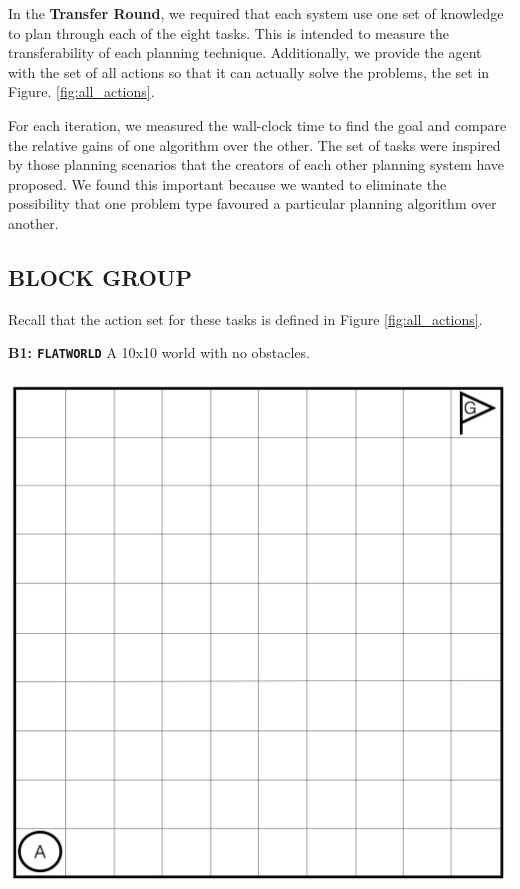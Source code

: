 \documentclass[]{article}
\begin{document}
In the {\bf Transfer Round}, we required that each system use one set of knowledge to plan through each of the eight tasks. This is intended to measure the transferability of each planning technique. Additionally, we provide the agent with the set of all actions so that it can actually solve the problems, the set in Figure. \ref{fig:all_actions}.

For each iteration, we measured the wall-clock time to find the goal and compare the relative gains of one algorithm over the other. The set of tasks were inspired by those planning scenarios that the creators of each other planning system have proposed. We found this important because we wanted to eliminate the possibility that one problem type favoured a particular planning algorithm over another.

\subsection{BLOCK GROUP}

Recall that the action set for these tasks is defined in Figure \ref{fig:all_actions}.

{\bf B1: \texttt{FLATWORLD}} A 10x10 world with no obstacles.

\begin{center}
\includegraphics[scale=0.24]{figures/flatland.png}
\end{center}
\end{document}
